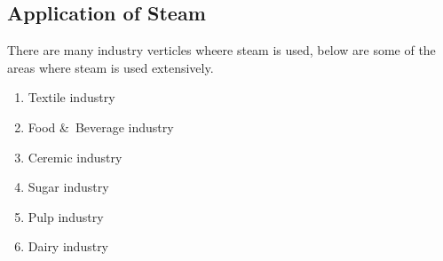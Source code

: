 \subsection{Application of Steam}
There are many industry verticles wheere steam is used, below are some of the areas where steam is used extensively.
\begin{enumerate}
    \item Textile industry
    \item Food \&\ Beverage industry
    \item Ceremic industry
    \item Sugar industry
    \item Pulp industry
    \item Dairy industry
\end{enumerate}